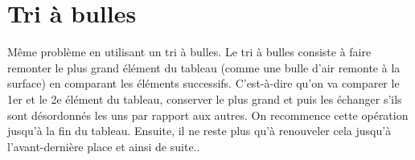 \documentclass[french]{article}
\begin{document}
\section{Tri à bulles}
Même problème en utilisant un tri à bulles. Le tri à bulles consiste à faire remonter le plus grand élément du tableau (comme une bulle d'air remonte à la surface) en comparant les éléments successifs. C'est-à-dire qu'on va comparer le 1er et le 2e élément du tableau, conserver le plus grand et puis les échanger s'ils sont désordonnés les uns par rapport aux autres. On recommence cette opération jusqu'à la fin du tableau. Ensuite, il ne reste plus qu'à renouveler cela jusqu'à l'avant-dernière place et ainsi de suite..
\end{document}

